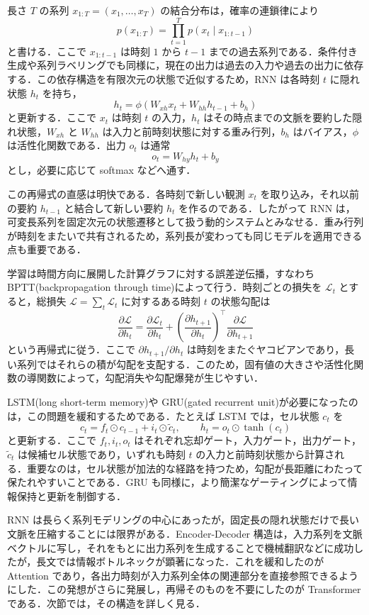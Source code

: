 長さ $T$ の系列 $x_{1:T}=(x_1,\dots,x_T)$ の結合分布は，確率の連鎖律により
\[
p(x_{1:T})
= \prod_{t=1}^T p(x_t\mid x_{1:t-1})
\]
と書ける．ここで $x_{1:t-1}$ は時刻 $1$ から $t-1$ までの過去系列である．条件付き生成や系列ラベリングでも同様に，現在の出力は過去の入力や過去の出力に依存する．この依存構造を有限次元の状態で近似するため，RNN は各時刻 $t$ に隠れ状態 $h_t$ を持ち，
\[
h_t = \phi(W_{xh}x_t + W_{hh}h_{t-1} + b_h)
\]
と更新する．ここで $x_t$ は時刻 $t$ の入力，$h_t$ はその時点までの文脈を要約した隠れ状態，$W_{xh}$ と $W_{hh}$ は入力と前時刻状態に対する重み行列，$b_h$ はバイアス，$\phi$ は活性化関数である．出力 $o_t$ は通常
\[
o_t = W_{hy}h_t + b_y
\]
とし，必要に応じて softmax などへ通す．

この再帰式の直感は明快である．各時刻で新しい観測 $x_t$ を取り込み，それ以前の要約 $h_{t-1}$ と結合して新しい要約 $h_t$ を作るのである．したがって RNN は，可変長系列を固定次元の状態遷移として扱う動的システムとみなせる．重み行列が時刻をまたいで共有されるため，系列長が変わっても同じモデルを適用できる点も重要である．

学習は時間方向に展開した計算グラフに対する誤差逆伝播，すなわち BPTT(backpropagation through time)によって行う．時刻ごとの損失を $\mathcal L_t$ とすると，総損失 $\mathcal L=\sum_t \mathcal L_t$ に対するある時刻 $t$ の状態勾配は
\[
\frac{\partial \mathcal L}{\partial h_t}
= \frac{\partial \mathcal L_t}{\partial h_t}
+ \left(\frac{\partial h_{t+1}}{\partial h_t}\right)^\top
\frac{\partial \mathcal L}{\partial h_{t+1}}
\]
という再帰式に従う．ここで $\partial h_{t+1}/\partial h_t$ は時刻をまたぐヤコビアンであり，長い系列ではそれらの積が勾配を支配する．このため，固有値の大きさや活性化関数の導関数によって，勾配消失や勾配爆発が生じやすい．

LSTM(long short-term memory)や GRU(gated recurrent unit)が必要になったのは，この問題を緩和するためである．たとえば LSTM では，セル状態 $c_t$ を
\[
c_t = f_t\odot c_{t-1} + i_t\odot \tilde c_t,
\qquad
h_t = o_t\odot \tanh(c_t)
\]
と更新する．ここで $f_t,i_t,o_t$ はそれぞれ忘却ゲート，入力ゲート，出力ゲート，$\tilde c_t$ は候補セル状態であり，いずれも時刻 $t$ の入力と前時刻状態から計算される．重要なのは，セル状態が加法的な経路を持つため，勾配が長距離にわたって保たれやすいことである．GRU も同様に，より簡潔なゲーティングによって情報保持と更新を制御する．

RNN は長らく系列モデリングの中心にあったが，固定長の隠れ状態だけで長い文脈を圧縮することには限界がある．Encoder-Decoder 構造は，入力系列を文脈ベクトルに写し，それをもとに出力系列を生成することで機械翻訳などに成功したが，長文では情報ボトルネックが顕著になった．これを緩和したのが Attention であり，各出力時刻が入力系列全体の関連部分を直接参照できるようにした．この発想がさらに発展し，再帰そのものを不要にしたのが Transformer である．次節では，その構造を詳しく見る．

